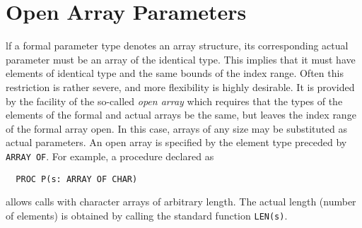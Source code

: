 \section{Open Array Parameters}
lf a formal parameter type denotes an array structure, its corresponding actual parameter
must be an array of the identical type. This implies that it must have elements of identical
type and the same bounds of the index range. Often this restriction is rather severe, and
more flexibility is highly desirable. It is provided by the facility of the so-called
\emph{open array} which requires that the types of the elements of the formal and actual
arrays be the same, but leaves the index range of the formal array open. In this case,
arrays of any size may be substituted as actual parameters. An open array is specified by
the element type preceded by \verb|ARRAY OF|. For example, a procedure declared as
\begin{verbatim}
  PROC P(s: ARRAY OF CHAR)
\end{verbatim}
allows calls with character arrays of arbitrary length. The actual length (number of
elements) is obtained by calling the standard function \verb|LEN(s)|.
